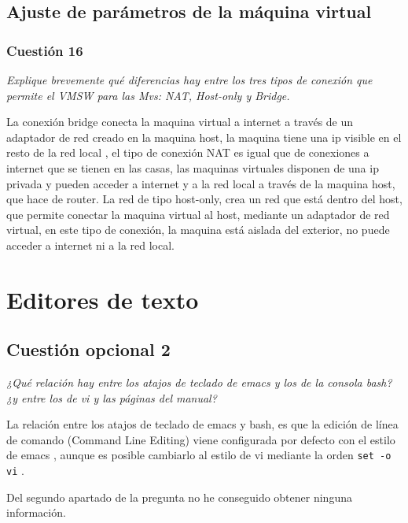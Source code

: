 \subsection{Ajuste de parámetros de la máquina virtual}
\subsubsection{Cuestión 16}
\textit{Explique brevemente qué diferencias hay entre los tres tipos de conexión que permite el VMSW para las Mvs: NAT, Host-only y Bridge.}\newline

La conexión bridge conecta la maquina virtual a internet a través de un adaptador de red creado en la maquina host, la maquina tiene una ip visible en el resto de la red local , el tipo de conexión NAT es igual que de conexiones a internet que se tienen en las casas, las maquinas virtuales disponen de una ip privada y pueden acceder a internet y a la red local a través de la maquina host, que hace de router. La red de tipo host-only, crea un red que está dentro del host, que permite conectar la maquina virtual al host, mediante un adaptador de red virtual, en este tipo de conexión, la maquina está aislada del exterior, no puede acceder a internet ni a la red local. \cite{red}

\section{Editores de texto}
\subsection{Cuestión opcional 2}
\textit{¿Qué relación hay entre los atajos de teclado de emacs y los de la consola bash? ¿y entre los de vi y las páginas del manual?}\newline

 La relación entre los atajos de teclado de emacs y bash, es que la edición de línea de comando (Command Line Editing) viene configurada por defecto con el estilo de emacs \cite{bash1}, aunque es posible cambiarlo al estilo de vi mediante la orden \texttt{set -o vi} \cite{bash2}.

Del segundo apartado de la pregunta no he conseguido obtener ninguna información.






\newpage




